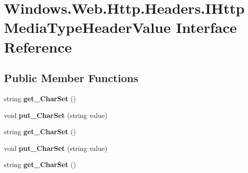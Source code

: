 \hypertarget{interface_windows_1_1_web_1_1_http_1_1_headers_1_1_i_http_media_type_header_value}{}\section{Windows.\+Web.\+Http.\+Headers.\+I\+Http\+Media\+Type\+Header\+Value Interface Reference}
\label{interface_windows_1_1_web_1_1_http_1_1_headers_1_1_i_http_media_type_header_value}
\subsection*{Public Member Functions}
\begin{DoxyCompactItemize}
\item 
\mbox{\label{interface_windows_1_1_web_1_1_http_1_1_headers_1_1_i_http_media_type_header_value_a06c664adae5f56ea18dce97ff84642e4}} 
string {\bfseries get\+\_\+\+Char\+Set} ()
\item 
\mbox{\label{interface_windows_1_1_web_1_1_http_1_1_headers_1_1_i_http_media_type_header_value_afbb0bada944b4050da266cc1290df488}} 
void {\bfseries put\+\_\+\+Char\+Set} (string value)
\item 
\mbox{\label{interface_windows_1_1_web_1_1_http_1_1_headers_1_1_i_http_media_type_header_value_a06c664adae5f56ea18dce97ff84642e4}} 
string {\bfseries get\+\_\+\+Char\+Set} ()
\item 
\mbox{\label{interface_windows_1_1_web_1_1_http_1_1_headers_1_1_i_http_media_type_header_value_afbb0bada944b4050da266cc1290df488}} 
void {\bfseries put\+\_\+\+Char\+Set} (string value)
\item 
\mbox{\label{interface_windows_1_1_web_1_1_http_1_1_headers_1_1_i_http_media_type_header_value_a06c664adae5f56ea18dce97ff84642e4}} 
string {\bfseries get\+\_\+\+Char\+Set} ()

\end{DoxyCompactItemize}
